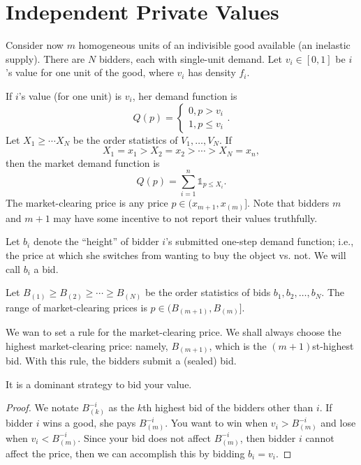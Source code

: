 \section{Independent Private Values}

Consider now $m$ homogeneous units of an indivisible good available (an inelastic supply). There are $N$ bidders, each with single-unit demand.
Let $v_i \in \left[ 0,1 \right]$ be $i$'s value for one unit of the good, where $v_i$ has density $f_i$. 

If $i$'s value (for one unit) is $v_i$, her demand function is \[
	Q(p) = \begin{cases}
		0, p > v_i \\
		1, p \le v_i
	\end{cases}
.\] 
Let $X_1 \ge \cdots X_N$ be the order statistics of $V_1,\ldots,V_N$.
If
\[
	X_1 = x_1 > X_2 = x_2 > \cdots > X_N = x_n,
\]
then the market demand function is
\[
	Q(p) = \sum\limits_{i=1}^{n} \mathds{1}_{p \le X_i}
.\] The market-clearing price is any price $p \in (x_{m+1}, x_{(m)}]$.
Note that bidders $m$ and $m+1$ may have some incentive to not report their values truthfully.

Let $b_i$ denote the ``height'' of bidder $i$'s submitted one-step demand function; i.e., the price at which she switches from wanting to buy the object vs. not. We will call $b_i$ a bid.

Let $B_{(1)} \ge B_{(2)} \ge \cdots \ge B_{(N)}$ be the order statistics of bids $b_1,b_2,\ldots,b_N$.
The range of market-clearing prices is $p \in (B_{(m+1)}, B_{(m)}]$.

	We wan to set a rule for the market-clearing price. We shall always choose the highest market-clearing price: namely, $B_{(m+1)}$, which is the $(m+1)$st-highest bid. With this rule, the bidders submit a (sealed) bid.

	\begin{proposition}	It is a dominant strategy to bid your value.
	\end{proposition}
\begin{proof}
	We notate $B_{(k)}^{-i}$ as the $k$th highest bid of the bidders other than $i$. If bidder $i$ wins a good, she pays $B_{(m)}^{-i}$. You want to win when $v_i > B_{(m)}^{-i}$ and lose when $v_i < B_{(m)}^{-i}$. Since your bid does not affect $B_{(m)}^{-i}$, then bidder $i$ cannot affect the price, then we can accomplish this by bidding $b_i = v_i$.
\end{proof}

